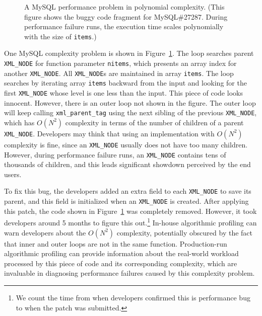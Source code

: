 \begin{figure}
\centering
{}
  \mbox{}
  \vspace{-0.1in}
\caption{A MySQL performance problem in polynomial complexity.
\footnotesize{(This figure shows the buggy code fragment for MySQL\#27287.
   During performance failure runs,
   the execution time scales polynomially with the size of \texttt{items}.)}}
\vspace{-0.05in}
\label{fig:mysql27287}
\vspace{-0.15in}
\end{figure}


One MySQL complexity problem is shown in Figure~\ref{fig:mysql27287}.
The loop searches parent \texttt{XML\_NODE} for function parameter \texttt{nitems},
which presents an array index for another \texttt{XML\_NODE}.
All \texttt{XML\_NODE}s are maintained in array \texttt{items}.
The loop searches by iterating array \texttt{items}
backward from the input and looking for the first \texttt{XML\_NODE}
whose level is one less than the input.
This piece of code looks innocent.
However, there is an outer loop not shown in the figure.
The outer loop will keep calling \texttt{xml\_parent\_tag} using
the next sibling of the previous \texttt{XML\_NODE},
which has $O(N^2)$ complexity in terms of the number of children of a parent \texttt{XML\_NODE}.
Developers may think that using an implementation with $O(N^2)$ complexity is fine,
since an \texttt{XML\_NODE} usually does not have too many children.
However, during performance failure runs,
an \texttt{XML\_NODE} contains tens of thousands of children,
and this leads significant showdown perceived by the end users.

To fix this bug, the developers added an extra field to each \texttt{XML\_NODE} to save its parent,
and this field is initialized when an \texttt{XML\_NODE} is created.
After applying this patch, the code shown in Figure~\ref{fig:mysql27287} was completely removed.
However, it took developers around 5 months to figure this
out.\footnote{We count the time from when developers confirmed this is performance bug
to when the patch was submitted.}
In-house algorithmic profiling can warn developers about the $O(N^2)$ complexity,
potentially obscured by the fact that inner and outer loops are not in the same function.
Production-run algorithmic profiling can provide information about the real-world workload
processed by this piece of code and its corresponding complexity,
which are invaluable in diagnosing performance failures caused by this complexity problem.


